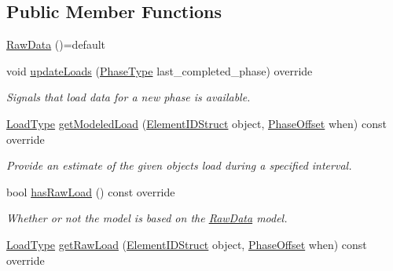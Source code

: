 \subsection*{Public Member Functions}
\begin{DoxyCompactItemize}
\item 
\hyperlink{structvt_1_1vrt_1_1collection_1_1balance_1_1_raw_data_a4879ed47b7d3da3008dc6199adc6d519}{Raw\+Data} ()=default
\item 
void \hyperlink{structvt_1_1vrt_1_1collection_1_1balance_1_1_raw_data_a4aaae24a53ead0248b873911ce560a34}{update\+Loads} (\hyperlink{namespacevt_a46ce6733d5cdbd735d561b7b4029f6d7}{Phase\+Type} last\+\_\+completed\+\_\+phase) override
\begin{DoxyCompactList}\small\item\em Signals that load data for a new phase is available. \end{DoxyCompactList}\item 
\hyperlink{namespacevt_a8fb51741340b87d7aaee0bef60e9896b}{Load\+Type} \hyperlink{structvt_1_1vrt_1_1collection_1_1balance_1_1_raw_data_a94b4d28a0a5024753cc382c9d1a0632d}{get\+Modeled\+Load} (\hyperlink{namespacevt_1_1vrt_1_1collection_1_1balance_a9f5b53fafb270212279a4757d2c4cd28}{Element\+I\+D\+Struct} object, \hyperlink{structvt_1_1vrt_1_1collection_1_1balance_1_1_phase_offset}{Phase\+Offset} when) const override
\begin{DoxyCompactList}\small\item\em Provide an estimate of the given object\textquotesingle{}s load during a specified interval. \end{DoxyCompactList}\item 
bool \hyperlink{structvt_1_1vrt_1_1collection_1_1balance_1_1_raw_data_a81391396ba96f5bc7578ac6d07d968ce}{has\+Raw\+Load} () const override
\begin{DoxyCompactList}\small\item\em Whether or not the model is based on the \hyperlink{structvt_1_1vrt_1_1collection_1_1balance_1_1_raw_data}{Raw\+Data} model. \end{DoxyCompactList}\item 
\hyperlink{namespacevt_a8fb51741340b87d7aaee0bef60e9896b}{Load\+Type} \hyperlink{structvt_1_1vrt_1_1collection_1_1balance_1_1_raw_data_ab676b33ed75ac294a0243f912d0b6309}{get\+Raw\+Load} (\hyperlink{namespacevt_1_1vrt_1_1collection_1_1balance_a9f5b53fafb270212279a4757d2c4cd28}{Element\+I\+D\+Struct} object, \hyperlink{structvt_1_1vrt_1_1collection_1_1balance_1_1_phase_offset}{Phase\+Offset} when) const override

\end{DoxyCompactItemize}
